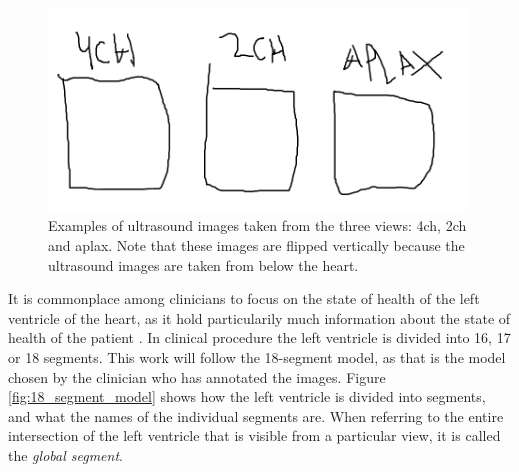 \begin{figure}[H]
    \centering
    \includegraphics[width=0.99\textwidth]{echocardiography/us_view_examples.png}
    \caption{Examples of ultrasound images taken from the three views: \acrfull{4ch}, \acrfull{2ch} and \acrfull{aplax}. Note that these images are flipped vertically because the ultrasound images are taken from below the heart.}
    \label{fig:us_view_examples}
\end{figure}

It is commonplace among clinicians to focus on the state of health of the left ventricle of the heart, as it hold particularily much information about the state of health of the patient \cite{myocardial_imaging}. In clinical procedure the left ventricle is divided into 16, 17 or 18 segments. This work will follow the 18-segment model, as that is the model chosen by the clinician who has annotated the images. Figure \ref{fig:18_segment_model} shows how the left ventricle is divided into segments, and what the names of the individual segments are. When referring to the entire intersection of the left ventricle that is visible from a particular view, it is called the \textit{global segment}.

